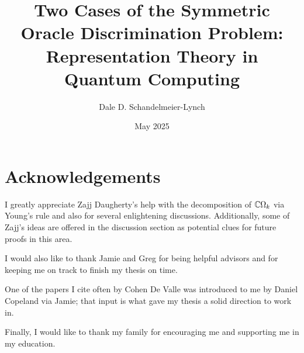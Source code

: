\documentclass[12pt,twoside]{reedthesis}
\title{Two Cases of the Symmetric Oracle Discrimination Problem: Representation Theory in Quantum Computing}
\author{Dale D. Schandelmeier-Lynch}
\date{May 2025}
\theoremstyle{plain}   %
\theoremstyle{definition}
\theoremstyle{remark}
\numberwithin{equation}{section}
\begin{document}
  \maketitle
  \frontmatter %
  \pagestyle{empty} %

  \chapter*{Acknowledgements}

  I greatly appreciate Zajj Daugherty's help with the decomposition of $\mathbb{C} \Omega_k$ via Young's rule and also for several enlightening discussions.
  Additionally, some of Zajj's ideas are offered in the discussion section as potential clues for future proofs in this area.
  
  \bigskip
  I would also like to thank Jamie and Greg for being helpful advisors and for keeping me on track to finish my thesis on time.
  
  \bigskip
  One of the papers I cite often by Cohen De Valle was introduced to me by Daniel Copeland via Jamie; that input is what gave my thesis a solid direction to work in.

  \bigskip
  Finally, I would like to thank my family for encouraging me and supporting me in my education.



\end{document}
